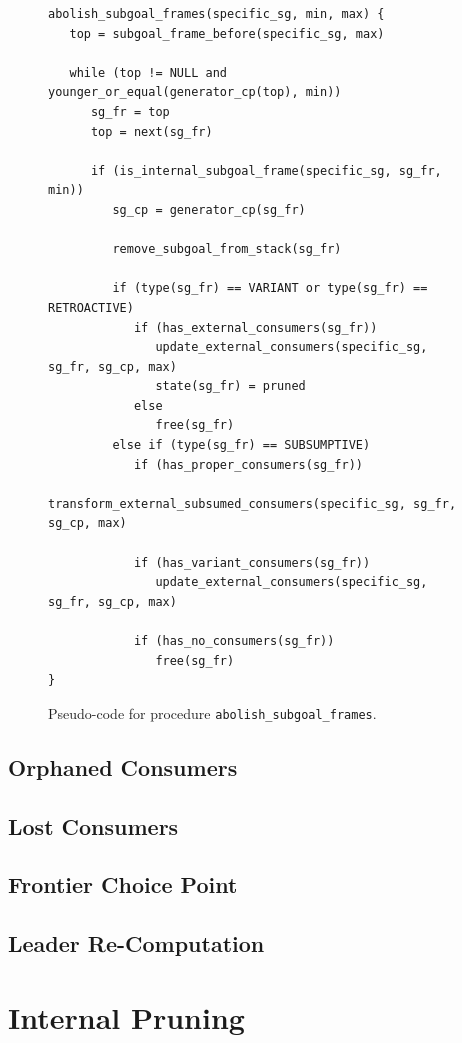 \begin{figure}[ht]
\begin{Verbatim}
abolish_subgoal_frames(specific_sg, min, max) {
   top = subgoal_frame_before(specific_sg, max)

   while (top != NULL and younger_or_equal(generator_cp(top), min))
      sg_fr = top
      top = next(sg_fr)

      if (is_internal_subgoal_frame(specific_sg, sg_fr, min))
         sg_cp = generator_cp(sg_fr)
         
         remove_subgoal_from_stack(sg_fr)
         
         if (type(sg_fr) == VARIANT or type(sg_fr) == RETROACTIVE)
            if (has_external_consumers(sg_fr))
               update_external_consumers(specific_sg, sg_fr, sg_cp, max)
               state(sg_fr) = pruned
            else
               free(sg_fr)
         else if (type(sg_fr) == SUBSUMPTIVE)
            if (has_proper_consumers(sg_fr))
               transform_external_subsumed_consumers(specific_sg, sg_fr, sg_cp, max)
            
            if (has_variant_consumers(sg_fr))
               update_external_consumers(specific_sg, sg_fr, sg_cp, max)
               
            if (has_no_consumers(sg_fr))
               free(sg_fr)
}
\end{Verbatim}
\caption{Pseudo-code for procedure \texttt{abolish\_subgoal\_frames}.}
\label{fig:abolish_subgoal_frames}
\end{figure}


\subsection{Orphaned Consumers}

\subsection{Lost Consumers}

\subsection{Frontier Choice Point}

\subsection{Leader Re-Computation}

\section{Internal Pruning}

